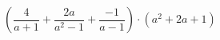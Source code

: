 \begin{ex}[type=expression]
	\begin{condition}
		\( \left( \dfrac{4}{a+1}+\dfrac{2a}{a^2-1}+\dfrac{-1}{a-1} \right)\cdot(a^2+2a+1) \)
	\end{condition}
\end{ex}